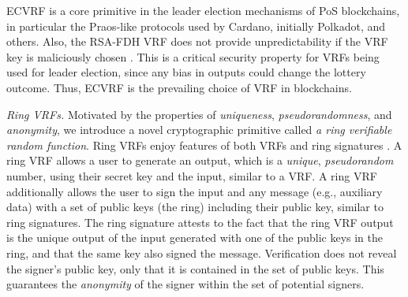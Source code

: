 ECVRF is a core primitive in the leader election mechanisms of PoS blockchains, in particular the Praos-like protocols \cite{KiayiasRDO17,DavidGKR17} used by Cardano, initially Polkadot, and others.  %
Also, the RSA-FDH VRF does not provide unpredictability if the VRF key is maliciously chosen \cite{VRF-RFC}. This is a critical security property for VRFs being used for leader election, since any bias in outputs could change the lottery outcome.  Thus, ECVRF is the prevailing choice of VRF in blockchains.
%
%

\smallskip
\noindent \emph{Ring VRFs.} Motivated by the properties of \emph{uniqueness}, \emph{pseudorandomness}, and \emph{anonymity}, we introduce a novel cryptographic primitive called \emph{a ring verifiable random function}.  Ring VRFs enjoy features of both VRFs \cite{vrf_micali}  and ring signatures \cite{ring_accountable,ring_efficient,ring_linkable,ring_noRO,ring_sublinear}. A ring VRF allows a user to generate an output, which is a \emph{unique}, \emph{pseudorandom} number, using their secret key and the input, similar to a VRF.  A ring VRF additionally allows the user to sign the input and any message (e.g., auxiliary data)  with a set of public keys (the ring) including their public key, similar to ring signatures. The ring signature attests to the fact that the ring VRF output is the unique output of the input generated with one of the public keys in the ring, and that the same key also signed the message. Verification does not reveal the signer's public key, only that it is contained in the set of public keys.
This guarantees the \emph{anonymity} of the signer within the set of potential signers.

